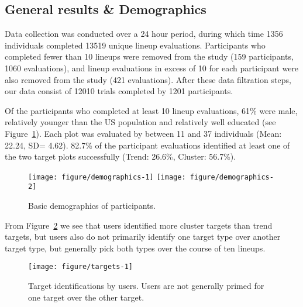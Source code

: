 \documentclass[12pt]{article}\usepackage[]{graphicx}\usepackage[]{color}
\newenvironment{knitrout}{}{} %
\begin{document}
\subsection{General results \& Demographics}
Data collection was conducted over a 24 hour period, 
during which time 1356 individuals completed 13519 unique lineup evaluations. 
Participants who completed fewer than 10 lineups were removed from the study (159 participants, 1060 evaluations), and lineup evaluations in excess of 10 for each participant were also removed from the study (421 evaluations). 
After these data filtration steps, our data consist of 12010 trials completed by 1201 participants. 

Of the participants who completed at least 10 lineup evaluations, 61\% were male, relatively younger than the US population and relatively well educated (see Figure~\ref{fig:demographics}). 
Each plot was evaluated by between 11 and 37 individuals 
(Mean: 22.24, SD= 4.62).
82.7\% of the participant evaluations identified at least one of the two target plots successfully (Trend: 26.6\%, Cluster: 56.7\%). 

\begin{figure}[ht]
\begin{knitrout}
\color{fgcolor}

{\centering \texttt{[image: figure/demographics-1]} 
\texttt{[image: figure/demographics-2]} 

}



\end{knitrout}
\caption{\label{fig:demographics}Basic demographics of participants.}
\end{figure}


From Figure~\ref{fig:targets} we see that users identified more cluster targets than trend targets, but users also do not primarily identify one target type over another target type, but generally pick both types over the course of ten lineups.

\begin{figure}[ht]
\centering
\begin{knitrout}
\color{fgcolor}

{\centering \texttt{[image: figure/targets-1]} 

}



\end{knitrout}
\caption{\label{fig:targets}Target identifications by users. Users are not generally primed for one target over the other target.}
\end{figure}
\end{document}
